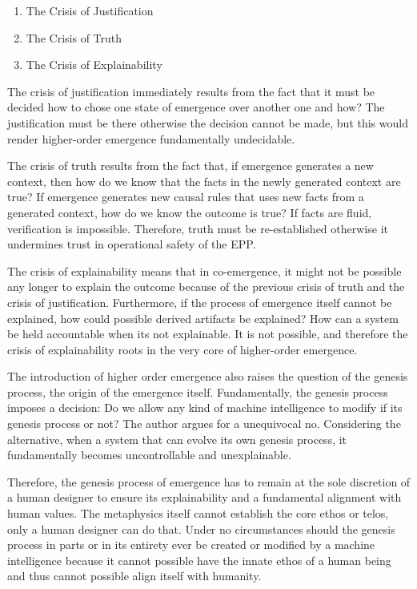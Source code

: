 \begin{enumerate}
	\item The Crisis of Justification
	\item The Crisis of Truth
	\item The Crisis of Explainability
\end{enumerate}


The crisis of justification immediately results from the fact that it must be decided how to chose one state of emergence over another one and how? The justification must be there otherwise the decision cannot be made, but this would render higher-order emergence fundamentally undecidable. 

The crisis of truth results from the fact that, if emergence generates a new context, then how do we know that
the facts in the newly generated context are true? If emergence generates new causal rules that uses new facts from a generated context, how do we know the outcome is true? If facts are fluid, verification is impossible. Therefore, truth must be re-established otherwise it undermines trust in operational safety of the EPP. 

The crisis of explainability means that in co-emergence, it might not be possible any longer to explain the outcome because of the previous crisis of truth and the crisis of justification. Furthermore, if the process of emergence itself cannot be explained, how could possible derived artifacts be explained? How can a system be held accountable when its not explainable. It is not possible, and therefore the crisis of explainability roots in the very core of higher-order emergence.

The introduction of higher order emergence also raises the question of the genesis process, 
the origin of the emergence itself. Fundamentally, the genesis process imposes a decision: Do we allow any kind of machine intelligence to modify if its genesis process or not? The author argues for a unequivocal no. 
Considering the alternative, when a system that can evolve its own genesis process, it fundamentally becomes uncontrollable and unexplainable. 

Therefore, the genesis process of emergence  has to remain at the sole discretion of a human designer to ensure its explainability and a fundamental alignment with human values. The metaphysics itself cannot establish the core ethos or telos, only a human designer can do that. Under no circumstances should the genesis process in parts or in its entirety ever be created or modified by a machine intelligence because it cannot possible have the innate ethos of a human being and thus cannot possible align itself with humanity. 

